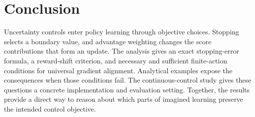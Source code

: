 \section{Conclusion}

Uncertainty controls enter policy learning through objective choices. Stopping selects a boundary value, and advantage weighting changes the score contributions that form an update. The analysis gives an exact stopping-error formula, a reward-shift criterion, and necessary and sufficient finite-action conditions for universal gradient alignment. Analytical examples expose the consequences when those conditions fail. The continuous-control study gives these questions a concrete implementation and evaluation setting. Together, the results provide a direct way to reason about which parts of imagined learning preserve the intended control objective.

